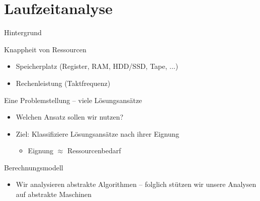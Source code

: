 \section{Laufzeitanalyse}

\begin{frame}{Hintergrund}
\begin{block}{Knappheit von Ressourcen}
    \begin{itemize}
        \item Speicherplatz (Register, RAM, HDD/SSD, Tape, ...)
        \item \alert{Rechenleistung} (Taktfrequenz)
    \end{itemize}
\end{block}
\begin{block}{Eine Problemstellung -- viele Lösungsansätze}
    \begin{itemize}
        \item Welchen Ansatz sollen wir nutzen?
        \item Ziel: Klassifiziere Lösungsansätze nach ihrer \alert{Eignung}
        \begin{itemize}
            \item Eignung $\approx$ Ressourcenbedarf
        \end{itemize}
    \end{itemize}
\end{block}
\begin{block}{Berechnungsmodell}
    \begin{itemize}
        \item Wir analysieren \alert{abstrakte Algorithmen} -- folglich st\"utzen wir unsere Analysen auf \alert{abstrakte Maschinen}
    \end{itemize}
\end{block}
\end{frame}




